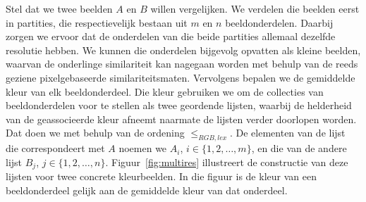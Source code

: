 Stel dat we twee beelden $A$ en $B$ willen
vergelijken. We verdelen
die beelden eerst in partities, die respectievelijk bestaan uit
$m$ en $n$ beeldonderdelen. Daarbij zorgen we ervoor dat de onderdelen
van die beide partities allemaal dezelfde resolutie hebben. We kunnen die onderdelen bijgevolg 
opvatten als kleine beelden, waarvan de onderlinge similariteit kan nagegaan worden met behulp van de reeds 
geziene pixelgebaseerde similariteitsmaten.
Vervolgens bepalen we de gemiddelde kleur van elk beeldonderdeel. Die kleur gebruiken we om
de collecties van beeldonderdelen voor te stellen als twee geordende lijsten, waarbij de 
helderheid van de geassocieerde kleur afneemt naarmate de lijsten verder doorlopen worden.
Dat doen we met behulp van de ordening $\leq_{RGB,lex}$. 
De elementen van de lijst die correspondeert met $A$ noemen 
we $A_i$, $i \in \{1,2,\ldots,m\}$, en die van de andere lijst $B_j$, $j \in \{1,2,\ldots,n\}$.
Figuur~\ref{fig:multires} illustreert de constructie van deze lijsten voor twee concrete
kleurbeelden. In die figuur is de kleur van een beeldonderdeel gelijk aan de gemiddelde 
kleur van dat onderdeel.

